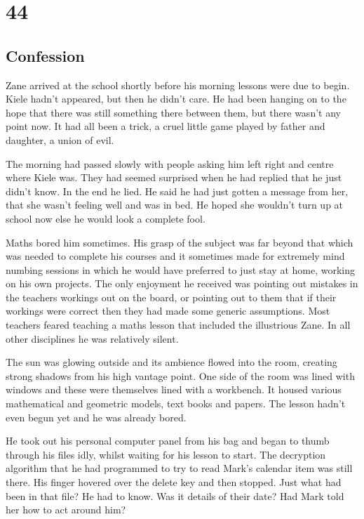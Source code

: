 \chapter{44}
\section{Confession}


Zane arrived at the school shortly before his morning lessons were due to begin.  Kiele hadn't appeared, but then he didn't care.  He had been hanging on to the hope that there was still something there between them, but there wasn't any point now.  It had all been a trick, a cruel little game played by father and daughter, a union of evil.

The morning had passed slowly with people asking him left right and centre where Kiele was.  They had seemed surprised when he had replied that he just didn't know.  In the end he lied.  He said he had just gotten a message from her, that she wasn't feeling well and was in bed.  He hoped she wouldn't turn up at school now else he would look a complete fool.

Maths bored him sometimes.  His grasp of the subject was far beyond that which was needed to complete his courses and it sometimes made for extremely mind numbing sessions in which he would have preferred to just stay at home, working on his own projects.  The only enjoyment he received was pointing out mistakes in the teachers workings out on the board, or pointing out to them that if their workings were correct then they had made some generic assumptions.  Most teachers feared teaching a maths lesson that included the illustrious Zane.  In all other disciplines he was relatively silent.

The sun was glowing outside and its ambience flowed into the room, creating strong shadows from his high vantage point.  One side of the room was lined with windows and these were themselves lined with a workbench.  It housed various mathematical and geometric models, text books and papers.  The lesson hadn't even begun yet and he was already bored.

He took out his personal computer panel from his bag and began to thumb through his files idly, whilst waiting for his lesson to start.  The decryption algorithm that he had programmed to try to read Mark's calendar item was still there.  His finger hovered over the delete key and then stopped.  Just what had been in that file?  He had to know.  Was it details of their date?  Had Mark told her how to act around him?

